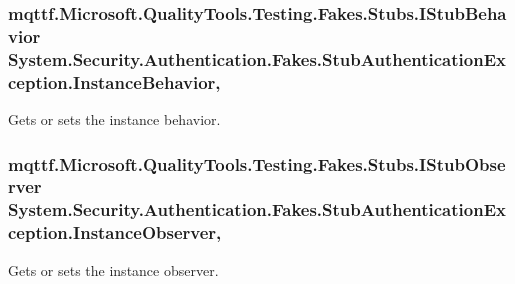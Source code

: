 \hypertarget{class_system_1_1_security_1_1_authentication_1_1_fakes_1_1_stub_authentication_exception_a305b457b595a936bb7c59e50df88c562}{
\subsubsection[{Instance\-Behavior}]{\setlength{\rightskip}{0pt plus 5cm}mqttf.\-Microsoft.\-Quality\-Tools.\-Testing.\-Fakes.\-Stubs.\-I\-Stub\-Behavior System.\-Security.\-Authentication.\-Fakes.\-Stub\-Authentication\-Exception.\-Instance\-Behavior\hspace{0.3cm}{\ttfamily [get]}, {\ttfamily [set]}}}\label{class_system_1_1_security_1_1_authentication_1_1_fakes_1_1_stub_authentication_exception_a305b457b595a936bb7c59e50df88c562}


Gets or sets the instance behavior.

\hypertarget{class_system_1_1_security_1_1_authentication_1_1_fakes_1_1_stub_authentication_exception_a6c63bbff447cf13bbc0a93c6379716c1}{
\subsubsection[{Instance\-Observer}]{\setlength{\rightskip}{0pt plus 5cm}mqttf.\-Microsoft.\-Quality\-Tools.\-Testing.\-Fakes.\-Stubs.\-I\-Stub\-Observer System.\-Security.\-Authentication.\-Fakes.\-Stub\-Authentication\-Exception.\-Instance\-Observer\hspace{0.3cm}{\ttfamily [get]}, {\ttfamily [set]}}}\label{class_system_1_1_security_1_1_authentication_1_1_fakes_1_1_stub_authentication_exception_a6c63bbff447cf13bbc0a93c6379716c1}


Gets or sets the instance observer.

